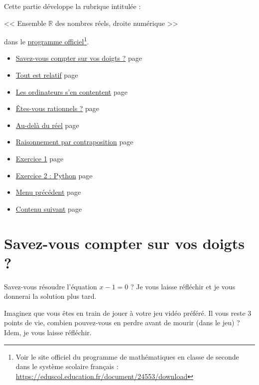 \documentclass[a4paper,11pt]{book}
\begin{document}
\clearpage


Cette partie développe la rubrique intitulée :

<< Ensemble \(\mathbb{R}\) des nombres réels, droite numérique >>

dans le \href{https://eduscol.education.fr/document/24553/download}{programme officiel}\footnote{Voir le site officiel du programme de mathématiques
en classe de seconde dans le système scolaire français :
\url{https://eduscol.education.fr/document/24553/download}}.
\clearpage

\label{orga5086f2}
\label{page:content1-menu}
\begin{itemize}
\item \hyperref[orgfb34aa0]{Savez-vous compter sur vos doigts ?}
page~\pageref{page:sec2.1.1digits}
\item \hyperref[orgdf90d81]{Tout est relatif}
page~\pageref{page:sec2.1.2int}
\item \hyperref[org1213e07]{Les ordinateurs s'en contentent}
page~\pageref{page:sec2.1.3cpu}
\item \hyperref[orgeac9191]{Êtes-vous rationnels ?}
page~\pageref{page:sec2.1.4rational}
\item \hyperref[orgff5d9b3]{Au-delà du réel}
page~\pageref{page:sec2.1.5real}
\item \hyperref[org084e38f]{Raisonnement par contraposition}
page~\pageref{page:sec2.1.6cp}
\item \hyperref[orgfd91183]{Exercice 1}
page~\pageref{page:sec2.1.7exo1}
\item \hyperref[orgce66a51]{Exercice 2 : Python}
page~\pageref{page:sec2.1.8exo2}
\item \hyperref[org2ce8f1f]{Menu précédent}
page~\pageref{page:content-menu}
\item \hyperref[org31d1c9a]{Contenu suivant}
page~\pageref{page:sec2.2content2}
\end{itemize}

\clearpage

\section{Savez-vous compter sur vos doigts ?}
\label{sec:org255b4f7}
\label{orgfb34aa0}
\label{page:sec2.1.1digits}
Savez-vous résoudre l'équation \(x - 1 = 0\) ? Je vous laisse
réfléchir et je vous donnerai la solution plus tard.

Imaginez que vous êtes en train de jouer à votre jeu vidéo
préféré. Il vous reste 3 points de vie, combien pouvez-vous en
perdre avant de mourir (dans le jeu) ? Idem, je vous laisse
réfléchir.
\end{document}
